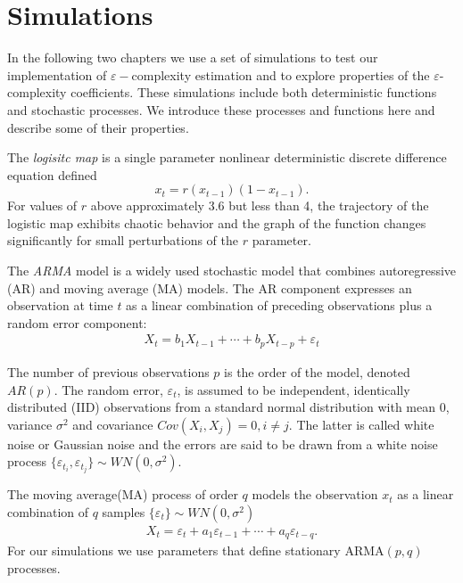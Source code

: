 \section{Simulations}

In the following two chapters we use a set of 
simulations to test our implementation of $\varepsilon-$complexity
estimation and to explore
properties of the $\varepsilon$-complexity coefficients. 
These simulations include both deterministic functions
and stochastic processes. We introduce these
processes and functions here and describe some of their properties.

The \textit{logisitc map} is a single parameter nonlinear deterministic discrete difference equation defined
\[
  x_t = r(x_{t-1})(1 - x_{t-1}).
\]
For values of $r$ above approximately 3.6 but less than 4, the trajectory of the 
logistic map exhibits chaotic behavior and the graph of the function
changes significantly for small perturbations of the $r$ parameter. 


The \textit{ARMA} model is a widely used stochastic model
that combines autoregressive (AR) and moving average (MA)
models. The AR component expresses an observation at time 
$t$ as a linear combination
of preceding observations plus a random error component:
\begin{align*}
  X_t  = b_1 X_{t-1} + \cdots + b_p X_{t-p} + \varepsilon_t
\end{align*}

The number of previous observations $p$ is the order of the 
model, denoted $AR(p)$. The random error, $\varepsilon_t$, 
is assumed to be independent, identically distributed (IID) observations from a standard normal distribution with 
mean 0, variance $\sigma^2$ and covariance 
$Cov(X_i, X_j) = 0, i \neq j$. The latter is called 
white noise or Gaussian noise and the errors are said to be 
drawn from a white noise process 
$\{ \varepsilon_{t_i}, \varepsilon_{t_j}\} \sim WN(0, \sigma^2)$. 

The moving average(MA) process of order $q$ models
the observation $x_t$ as a linear combination of $q$
samples $\{ \varepsilon_t \} \sim WN(0, \sigma^2)$  
\begin{align}
  X_t = \varepsilon_t + a_1 \varepsilon_{t-1} + 
\cdots + a_q \varepsilon_{t-q}.
\end{align}
For our simulations we use parameters that define stationary ARMA$(p,q)$ processes.

